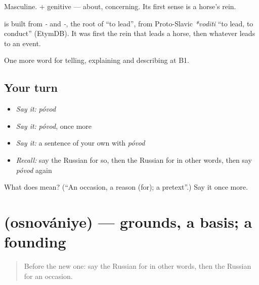 Masculine. \emph{ } + genitive — about, concerning. Its first sense is a horse’s rein.

\begin{cousinweb}
\textbf{} is built from \emph{-} and \emph{-}, the root of \emph{} \textquotedblleft{}to lead\textquotedblright{}, from Proto-Slavic \emph{*voditi} \textquotedblleft{}to lead, to conduct\textquotedblright{} (EtymDB). It was first the rein that leads a horse, then whatever leads to an event.
\end{cousinweb}

\begin{grammarlens}[title={What you've built}]
One more word for telling, explaining and describing at B1.
\end{grammarlens}

\subsection*{Your turn}
\begin{itemize}
\raggedright
  \item \emph{Say it:} \emph{póvod}
  \item \emph{Say it:} \emph{póvod}, once more
  \item \emph{Say it:} a sentence of your own with \emph{póvod}
  \item \emph{Recall:} say the Russian for so, then the Russian for in other words, then say \emph{póvod} again
\end{itemize}

\begin{tcolorbox}[breakable,colback=teal!4,colframe=teal!35!black,title={Before you move on}]
What does  mean? (\textquotedblleft{}An occasion, a reason (for); a pretext\textquotedblright{}.) Say it once more.
\end{tcolorbox}
\section[\texorpdfstring{\ru{основание} (osnovániye)}{основание (osnovániye)}]{ (osnovániye) — grounds, a basis; a founding}

\label{lesson:RU-C348-osnovanie}



\begin{quote}
Before the new one: say the Russian for in other words, then the Russian for an occasion.
\end{quote}

